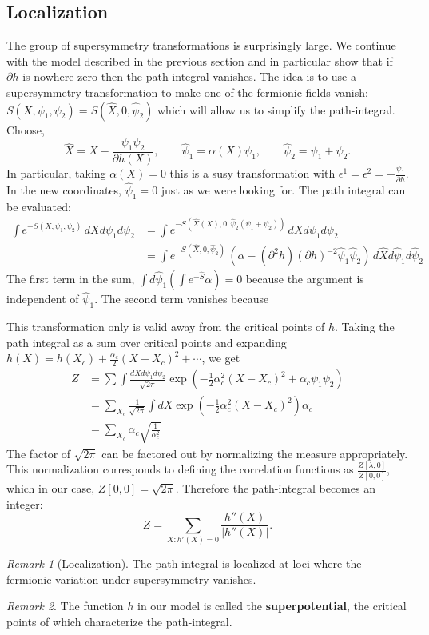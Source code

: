 \documentclass{report}
\theoremstyle{plain}
\theoremstyle{definition}
\theoremstyle{remark}
\newtheorem*{remark}{Remark}
\newcommand{\di}{\partial}
\newcommand{\FR}[2]{\frac{#1}{#2}}
\newcommand{\SFR}[2]{\sqrt{\frac{#1}{#2}}}
\begin{document}
\subsection{Localization}
The group of supersymmetry transformations is surprisingly large. We
continue with the model described in the previous section and in particular
show that if $\di h$ is nowhere zero then the path integral vanishes.
The idea is to use a supersymmetry transformation to make one of the
fermionic fields vanish: $S(X,\psi_1,\psi_2) = S(\hat X,0,\hat \psi_2)$
which will allow us to simplify the path-integral. Choose,
\[ \hat X = X-\FR{\psi_1\psi_2}{\di h(X)},\qquad
   \hat\psi_1 = \alpha(X)\psi_1,\qquad
   \hat\psi_2 = \psi_1+\psi_2.\]
In particular, taking $\alpha(X)=0$ this is a susy transformation with
$\epsilon^1=\epsilon^2=-\FR{\psi_1}{\di h}$. In the new coordinates,
$\hat\psi_1=0$ just as we were looking for. The path integral can be
evaluated:
\begin{align*}
    \int e^{-S(X,\psi_1,\psi_2)}\,dXd\psi_1d\psi_2
&= \int e^{-S(\hat X(X),0,\hat\psi_2(\psi_1+\psi_2))}\,dXd\psi_1d\psi_2\\
&= \int e^{-S(\hat X,0,\hat\psi_2)}\,\left( \alpha - 
(\di^2 h)(\di h)^{-2}\hat\psi_1\hat\psi_2 \right)\,
d\hat Xd\hat \psi_1d\hat \psi_2
\end{align*}
The first term in the sum, $\int d\hat\psi_1 \left(\int e^{-\hat
S}\alpha\right) = 0$ because the argument is independent of $\hat\psi_1$.
The second term vanishes because 

This transformation only is valid away from the critical points of $h$.
Taking the path integral as a sum over critical points and expanding 
$h(X) = h(X_c)+\FR{\alpha_c}{2}(X-X_c)^2 + \cdots$, we get
\begin{align*}
    Z &= \sum \int \FR{dXd\psi_1d\psi_2}{\sqrt{2\pi}}
    \exp\left(-\FR{1}{2}\alpha_c^2(X-X_c)^2 + \alpha_c\psi_1\psi_2\right)\\
    &= \sum_{X_c} \FR{1}{\sqrt{2\pi}}\int dX
    \exp\left(-\FR{1}{2}\alpha_c^2(X-X_c)^2\right) \alpha_c\\
&= \sum_{X_c} \alpha_c \SFR{1}{\alpha_c^2}
\end{align*}
The factor of $\sqrt{2\pi}$ can be factored out by normalizing the measure
appropriately. This normalization corresponds to defining the correlation
functions as $\FR{Z[\lambda,0]}{Z[0,0]}$, which in our case,
$Z[0,0]=\sqrt{2\pi}$. Therefore the path-integral becomes an integer:
\[ Z = \sum_{X \colon h'(X)=0} \FR{h''(X)}{|h''(X)|}.\]
\begin{remark}[Localization] The path integral is localized at loci where
the fermionic variation under supersymmetry vanishes. 
\end{remark}
\begin{remark} The function $h$ in our model is called the
\textbf{superpotential}, the critical points of which characterize the
path-integral.
\end{remark}
\end{document}
